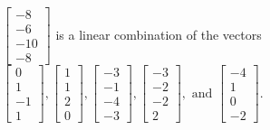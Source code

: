 \begin{exercise}
\begin{exerciseStatement}
  \end{exerciseStatement}
  \begin{exerciseAnswer}
   \(\left[\begin{array}{c}
-8 \\
-6 \\
-10 \\
-8
\end{array}\right]\) 
  	 is  
	a linear combination of the vectors \(\left[\begin{array}{c}
0 \\
1 \\
-1 \\
1
\end{array}\right] , \left[\begin{array}{c}
1 \\
1 \\
2 \\
0
\end{array}\right] , \left[\begin{array}{c}
-3 \\
-1 \\
-4 \\
-3
\end{array}\right] , \left[\begin{array}{c}
-3 \\
-2 \\
-2 \\
2
\end{array}\right] , \text{ and } \left[\begin{array}{c}
-4 \\
1 \\
0 \\
-2
\end{array}\right]\).

	
  


  \end{exerciseAnswer}
\end{exercise}
